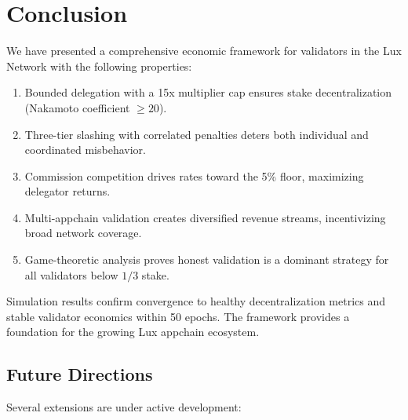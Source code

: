 \section{Conclusion}
\label{sec:conclusion}

We have presented a comprehensive economic framework for validators in the Lux Network with the following properties:

\begin{enumerate}
    \item Bounded delegation with a 15x multiplier cap ensures stake decentralization (Nakamoto coefficient $\geq 20$).
    \item Three-tier slashing with correlated penalties deters both individual and coordinated misbehavior.
    \item Commission competition drives rates toward the 5\% floor, maximizing delegator returns.
    \item Multi-appchain validation creates diversified revenue streams, incentivizing broad network coverage.
    \item Game-theoretic analysis proves honest validation is a dominant strategy for all validators below $1/3$ stake.
\end{enumerate}

Simulation results confirm convergence to healthy decentralization metrics and stable validator economics within 50 epochs. The framework provides a foundation for the growing Lux appchain ecosystem.

\subsection{Future Directions}

Several extensions are under active development:

